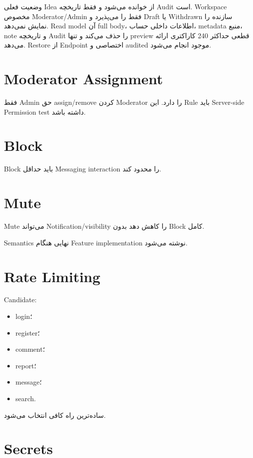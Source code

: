 وضعیت فعلی Idea از  خوانده می‌شود و
 فقط تاریخچه Audit است. Workspace مخصوص Moderator/Admin فقط
 را می‌پذیرد و Draft یا Withdrawn سازنده را نمایش نمی‌دهد.
Read model آن full body، اطلاعات داخلی حساب، metadata منبع، note و تاریخچه Audit را
حذف می‌کند و تنها preview قطعی حداکثر 240 کاراکتری ارائه می‌دهد. Restore از Endpoint
اختصاصی و audited موجود انجام می‌شود.

\section{Moderator Assignment}

\begin{decisionbox}
فقط Admin حق assign/remove کردن Moderator را دارد. این Rule باید Server-side Permission test داشته باشد.
\end{decisionbox}

\section{Block}

Block باید حداقل Messaging interaction را محدود کند.

\section{Mute}

Mute می‌تواند Notification/visibility را کاهش دهد بدون Block کامل.

Semantics نهایی هنگام Feature implementation نوشته می‌شود.

\section{Rate Limiting}

Candidate:
\begin{itemize}
  \item login؛
  \item register؛
  \item comment؛
  \item report؛
  \item message؛
  \item search.
\end{itemize}

ساده‌ترین راه کافی انتخاب می‌شود.

\section{Secrets}

